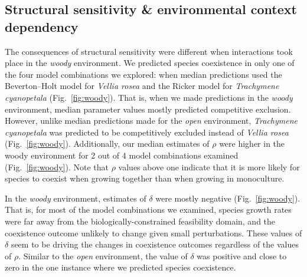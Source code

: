 \begin{refsection}
\subsection*{Structural sensitivity \& environmental context dependency }


The consequences of structural sensitivity were different when interactions took place in the \textit{woody} environment. We predicted species coexistence in only one of the four model combinations we explored: when median predictions used the Beverton--Holt model for \textit{Vellia rosea} and the Ricker model for \textit{Trachymene cyanopetala} (Fig.~\ref{fig:woody}). That is, when we made predictions in the \textit{woody} environment, median parameter values mostly predicted competitive exclusion. However, unlike median predictions made for the \textit{open} environment, \textit{Trachymene cyanopetala} was predicted to be competitively excluded instead of \textit{Vellia rosea} (Fig.~\ref{fig:woody}). Additionally, our median estimates of $\rho$  were higher in the woody environment for 2 out of 4 model combinations examined (Fig.~\ref{fig:woody}). Note that $\rho$ values above one indicate that it is more likely for species to  coexist when growing together than when growing in monoculture.

In the \textit{woody} environment, estimates of $\delta$ were mostly negative (Fig.~\ref{fig:woody}). That is, for most of the model combinations we examined, species growth rates were far away from the biologically-constrained feasibility domain, and the coexistence outcome unlikely to change given small perturbations. These values of $\delta$ seem to be driving the changes in coexistence outcomes regardless of the values of $\rho$. Similar to the \textit{open} environment, the value of $\delta$ was positive and close to zero in the one instance where we predicted species coexistence.


\end{refsection}
